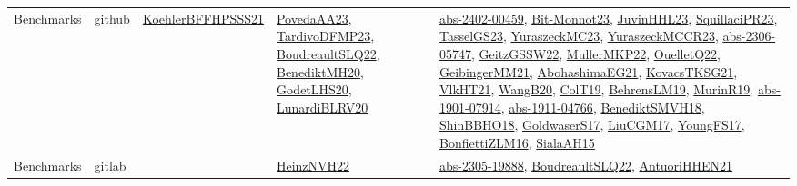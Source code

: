 {\begin{longtable}{lp{3cm}>{\raggedright}p{6cm}>{\raggedright}p{6cm}p{8cm}}
Benchmarks & github & \href{articles/KoehlerBFFHPSSS21.pdf}{KoehlerBFFHPSSS21}\cite{KoehlerBFFHPSSS21} & \href{papers/PovedaAA23.pdf}{PovedaAA23}\cite{PovedaAA23}, \href{papers/TardivoDFMP23.pdf}{TardivoDFMP23}\cite{TardivoDFMP23}, \href{papers/BoudreaultSLQ22.pdf}{BoudreaultSLQ22}\cite{BoudreaultSLQ22}, \href{articles/BenediktMH20.pdf}{BenediktMH20}\cite{BenediktMH20}, \href{papers/GodetLHS20.pdf}{GodetLHS20}\cite{GodetLHS20}, \href{articles/LunardiBLRV20.pdf}{LunardiBLRV20}\cite{LunardiBLRV20} & \href{articles/abs-2402-00459.pdf}{abs-2402-00459}\cite{abs-2402-00459}, \href{papers/Bit-Monnot23.pdf}{Bit-Monnot23}\cite{Bit-Monnot23}, \href{papers/JuvinHHL23.pdf}{JuvinHHL23}\cite{JuvinHHL23}, \href{papers/SquillaciPR23.pdf}{SquillaciPR23}\cite{SquillaciPR23}, \href{papers/TasselGS23.pdf}{TasselGS23}\cite{TasselGS23}, \href{papers/YuraszeckMC23.pdf}{YuraszeckMC23}\cite{YuraszeckMC23}, \href{articles/YuraszeckMCCR23.pdf}{YuraszeckMCCR23}\cite{YuraszeckMCCR23}, \href{articles/abs-2306-05747.pdf}{abs-2306-05747}\cite{abs-2306-05747}, \href{papers/GeitzGSSW22.pdf}{GeitzGSSW22}\cite{GeitzGSSW22}, \href{articles/MullerMKP22.pdf}{MullerMKP22}\cite{MullerMKP22}, \href{papers/OuelletQ22.pdf}{OuelletQ22}\cite{OuelletQ22}, \href{papers/GeibingerMM21.pdf}{GeibingerMM21}\cite{GeibingerMM21}, \href{articles/AbohashimaEG21.pdf}{AbohashimaEG21}\cite{AbohashimaEG21}, \href{papers/KovacsTKSG21.pdf}{KovacsTKSG21}\cite{KovacsTKSG21}, \href{articles/VlkHT21.pdf}{VlkHT21}\cite{VlkHT21}, \href{papers/WangB20.pdf}{WangB20}\cite{WangB20}, \href{papers/ColT19.pdf}{ColT19}\cite{ColT19}, \href{papers/BehrensLM19.pdf}{BehrensLM19}\cite{BehrensLM19}, \href{papers/MurinR19.pdf}{MurinR19}\cite{MurinR19}, \href{articles/abs-1901-07914.pdf}{abs-1901-07914}\cite{abs-1901-07914}, \href{articles/abs-1911-04766.pdf}{abs-1911-04766}\cite{abs-1911-04766}, \href{papers/BenediktSMVH18.pdf}{BenediktSMVH18}\cite{BenediktSMVH18}, \href{articles/ShinBBHO18.pdf}{ShinBBHO18}\cite{ShinBBHO18}, \href{papers/GoldwaserS17.pdf}{GoldwaserS17}\cite{GoldwaserS17}, \href{papers/LiuCGM17.pdf}{LiuCGM17}\cite{LiuCGM17}, \href{papers/YoungFS17.pdf}{YoungFS17}\cite{YoungFS17}, \href{papers/BonfiettiZLM16.pdf}{BonfiettiZLM16}\cite{BonfiettiZLM16}, \href{papers/SialaAH15.pdf}{SialaAH15}\cite{SialaAH15}\\
Benchmarks & gitlab &  & \href{articles/HeinzNVH22.pdf}{HeinzNVH22}\cite{HeinzNVH22} & \href{articles/abs-2305-19888.pdf}{abs-2305-19888}\cite{abs-2305-19888}, \href{papers/BoudreaultSLQ22.pdf}{BoudreaultSLQ22}\cite{BoudreaultSLQ22}, \href{papers/AntuoriHHEN21.pdf}{AntuoriHHEN21}\cite{AntuoriHHEN21}\\

\end{longtable}}
